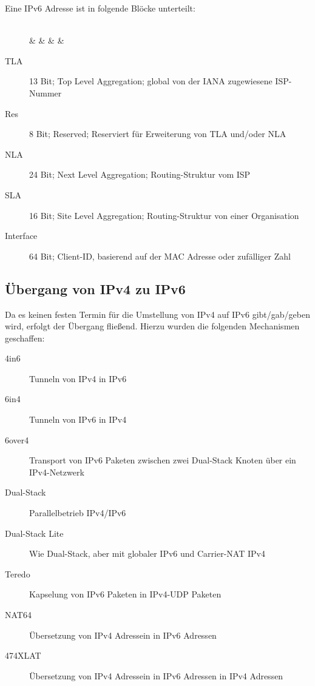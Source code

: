             Eine IPv6 Adresse ist in folgende Blöcke unterteilt:
            \begin{figure}[H]
            	\centering
            	\begin{bytefield}[bitwidth = 7pt]{64}
            		 \\
            		 &  &  &  &  \\
            	\end{bytefield}
            \end{figure}
            \begin{description}
            	\item[TLA] 13 Bit; Top Level Aggregation; global von der IANA zugewiesene ISP-Nummer
            	\item[Res] 8 Bit; Reserved; Reserviert für Erweiterung von TLA und/oder NLA
            	\item[NLA] 24 Bit; Next Level Aggregation; Routing-Struktur vom ISP
            	\item[SLA] 16 Bit; Site Level Aggregation; Routing-Struktur von einer Organisation
            	\item[Interface] 64 Bit; Client-ID, basierend auf der MAC Adresse oder zufälliger Zahl
            \end{description}

        \subsection{Übergang von IPv4 zu IPv6}
            Da es keinen festen Termin für die Umstellung von IPv4 auf IPv6 gibt/gab/geben wird, erfolgt der Übergang fließend. Hierzu wurden die folgenden Mechanismen geschaffen:
            \begin{description}
            	\item[4in6] Tunneln von IPv4 in IPv6
            	\item[6in4] Tunneln von IPv6 in IPv4
            	\item[6over4] Transport von IPv6 Paketen zwischen zwei Dual-Stack Knoten über ein IPv4-Netzwerk
            	\item[Dual-Stack] Parallelbetrieb IPv4/IPv6
            	\item[Dual-Stack Lite] Wie Dual-Stack, aber mit globaler IPv6 und Carrier-NAT IPv4
            	\item[Teredo] Kapselung von IPv6 Paketen in IPv4-UDP Paketen
            	\item[NAT64] Übersetzung von IPv4 Adressein in IPv6 Adressen
            	\item[474XLAT] Übersetzung von IPv4 Adressein in IPv6 Adressen in IPv4 Adressen
            \end{description}

